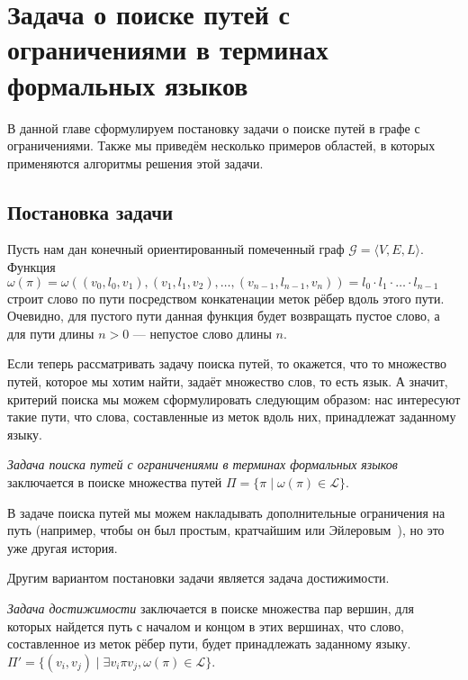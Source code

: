 \chapter[Пути с ограничениями в терминах формальных языков]{Задача о поиске путей с ограничениями в терминах формальных языков}\label{chpt:FLPQ}



В данной главе сформулируем постановку задачи о поиске путей в графе с ограничениями.
Также мы приведём несколько примеров областей, в которых применяются алгоритмы решения этой задачи.

\section{Постановка задачи }


Пусть нам дан конечный ориентированный помеченный граф $\mathcal{G}=\langle V,E,L \rangle$.
Функция $\omega(\pi) = \omega((v_0, l_0, v_1),(v_1,l_1,v_2),\dots,(v_{n-1},l_{n-1},v_n)) = l_0 \cdot l_1 \cdot \ldots \cdot l_{n-1} $ строит слово по пути посредством конкатенации меток рёбер вдоль этого пути.
Очевидно, для пустого пути данная функция будет возвращать пустое слово, а для пути длины $n  > 0$ --- непустое слово длины $n$.

Если теперь рассматривать задачу поиска путей, то окажется, что то множество путей, которое мы хотим найти, задаёт множество слов, то есть язык.
А значит, критерий поиска мы можем сформулировать следующим образом: нас интересуют такие пути, что слова, составленные из меток вдоль них, принадлежат заданному языку.
\begin{definition} \label{def1}
    \textit{Задача поиска путей с ограничениями в терминах формальных языков} заключается в поиске множества путей $\Pi = \{\pi \mid \omega(\pi) \in \mathcal{L}\}$.

\end{definition}

В задаче поиска путей мы можем накладывать дополнительные ограничения на путь (например, чтобы он был простым, кратчайшим или Эйлеровым~\cite{kupferman2016eulerian}), но это уже другая история.

Другим вариантом постановки задачи является задача достижимости.

\begin{definition} \label{def2}
    \textit{Задача достижимости} заключается в поиске множества пар вершин, для которых найдется путь с началом и концом в этих вершинах, что слово, составленное из меток рёбер пути, будет принадлежать заданному языку.
    $\Pi' = \{(v_{i}, v_{j}) \mid \exists v_{i} \pi v_{j}, \omega(\pi) \in \mathcal{L}\}$.

\end{definition}

